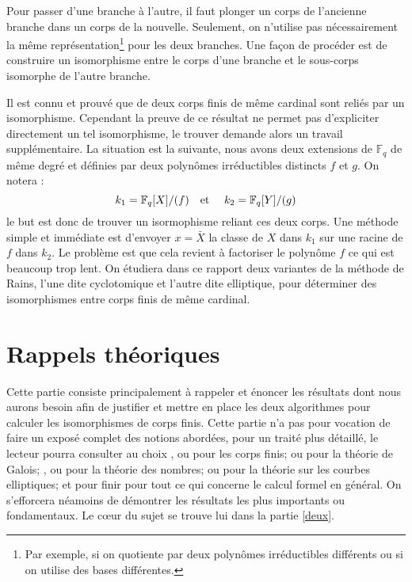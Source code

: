 \documentclass[a4paper]{article} %
\numberwithin{section}{part}
\numberwithin{equation}{section}
\newcommand\GF[1]{\mathbb{F}_{#1}}
\newcommand\etmath{\textup{\quad et \quad}}
\begin{document}
Pour passer d'une branche à l'autre, il faut plonger un corps de l'ancienne
branche dans un corps de la nouvelle. Seulement, on n'utilise pas nécessairement
la même représentation\footnote{Par exemple, si on quotiente par deux polynômes
irréductibles différents ou si on utilise des bases différentes.} pour les deux 
branches. Une façon de procéder est de construire un isomorphisme entre le corps
d'une branche et le sous-corps isomorphe de l'autre branche.\par
Il est connu et prouvé que de deux corps finis de même cardinal sont reliés par
un isomorphisme. Cependant la preuve de ce résultat ne permet pas d'expliciter
directement un tel isomorphisme, le trouver demande alors un travail 
supplémentaire. La situation est la suivante, nous avons deux extensions de 
$\GF{q}$ de même degré et définies par deux polynômes irréductibles distincts 
$f$ et $g$. On notera :
\[k_1=\GF{q}[X]/(f)\etmath k_2=\GF{q}[Y]/(g)\]
le but est donc de trouver un isormophisme reliant ces deux corps. 
Une méthode simple et immédiate est d'envoyer $x = \bar{X}$ la classe de $X$
dans $k_1$ sur une racine de $f$ dans $k_2$. Le problème est que cela revient à 
factoriser le polynôme $f$ ce qui est beaucoup trop lent. On étudiera dans ce
rapport deux variantes de la méthode de Rains, l'une dite cyclotomique et
l'autre dite elliptique, pour déterminer des isomorphismes entre corps finis de
même cardinal.

\newpage
{}
\tableofcontents
\newpage

\part{Rappels théoriques}
\label{un}

Cette partie consiste principalement à rappeler et énoncer les résultats dont
nous aurons besoin afin de justifier et mettre en place les deux algorithmes 
pour calculer les isomorphismes de corps finis. Cette partie n'a pas pour 
vocation de faire un exposé complet des notions abordées, pour un traité plus 
détaillé, le lecteur pourra consulter au choix \cite{LiNi1}, \cite{MuPa} ou 
\cite[chap.~III]{Per} pour les corps finis;
\cite[chap.~VI]{Sam} ou \cite{Esc} pour la théorie de Galois; \cite{Sam}, 
\cite{Was1} ou \cite{Lan} pour la théorie des nombres; \cite{Sil} ou 
\cite{Was2} pour la théorie sur les courbes elliptiques; et pour finir 
\cite{GaGe} pour tout ce qui concerne le calcul formel en général. On 
s'efforcera néamoins de démontrer les résultats les plus importants ou 
fondamentaux. Le c\oe ur du sujet se trouve lui dans la partie \ref{deux}.
\end{document}
